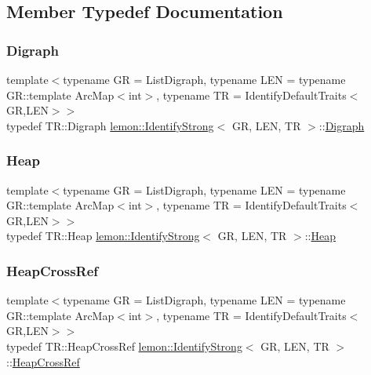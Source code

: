 \subsection{Member Typedef Documentation}
\mbox{\label{classlemon_1_1_identify_strong_a8cf9250557b236f81e713bf32a048d49}} 
\subsubsection{\texorpdfstring{Digraph}{Digraph}}
{\footnotesize\ttfamily template$<$typename GR  = List\+Digraph, typename L\+EN  = typename G\+R\+::template Arc\+Map$<$int$>$, typename TR  = Identify\+Default\+Traits$<$\+G\+R,\+L\+E\+N$>$$>$ \\
typedef T\+R\+::\+Digraph \hyperlink{classlemon_1_1_identify_strong}{lemon\+::\+Identify\+Strong}$<$ GR, L\+EN, TR $>$\+::\hyperlink{classlemon_1_1_identify_strong_a8cf9250557b236f81e713bf32a048d49}{Digraph}}

\mbox{\label{classlemon_1_1_identify_strong_a3ba858c53d76a3df469bdd55e294cd35}} 
\subsubsection{\texorpdfstring{Heap}{Heap}}
{\footnotesize\ttfamily template$<$typename GR  = List\+Digraph, typename L\+EN  = typename G\+R\+::template Arc\+Map$<$int$>$, typename TR  = Identify\+Default\+Traits$<$\+G\+R,\+L\+E\+N$>$$>$ \\
typedef T\+R\+::\+Heap \hyperlink{classlemon_1_1_identify_strong}{lemon\+::\+Identify\+Strong}$<$ GR, L\+EN, TR $>$\+::\hyperlink{classlemon_1_1_identify_strong_a3ba858c53d76a3df469bdd55e294cd35}{Heap}}

\mbox{\label{classlemon_1_1_identify_strong_a40dee7c87759955383fb3feb316435d1}} 
\subsubsection{\texorpdfstring{Heap\+Cross\+Ref}{HeapCrossRef}}
{\footnotesize\ttfamily template$<$typename GR  = List\+Digraph, typename L\+EN  = typename G\+R\+::template Arc\+Map$<$int$>$, typename TR  = Identify\+Default\+Traits$<$\+G\+R,\+L\+E\+N$>$$>$ \\
typedef T\+R\+::\+Heap\+Cross\+Ref \hyperlink{classlemon_1_1_identify_strong}{lemon\+::\+Identify\+Strong}$<$ GR, L\+EN, TR $>$\+::\hyperlink{classlemon_1_1_identify_strong_a40dee7c87759955383fb3feb316435d1}{Heap\+Cross\+Ref}}

